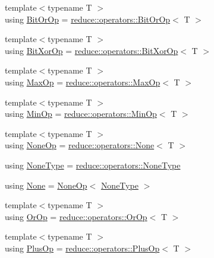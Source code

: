 \begin{DoxyCompactItemize}
\item 
{\footnotesize template$<$typename T $>$ }\\using \hyperlink{namespacevt_1_1collective_a07085d466f47337de6f1d6ea30023c11}{Bit\+Or\+Op} = \hyperlink{structvt_1_1collective_1_1reduce_1_1operators_1_1_bit_or_op}{reduce\+::operators\+::\+Bit\+Or\+Op}$<$ T $>$
\item 
{\footnotesize template$<$typename T $>$ }\\using \hyperlink{namespacevt_1_1collective_a834c8e21559219187ec9ef79f72cf474}{Bit\+Xor\+Op} = \hyperlink{structvt_1_1collective_1_1reduce_1_1operators_1_1_bit_xor_op}{reduce\+::operators\+::\+Bit\+Xor\+Op}$<$ T $>$
\item 
{\footnotesize template$<$typename T $>$ }\\using \hyperlink{namespacevt_1_1collective_aee17b1e7ed3266f7407f01253ecc2807}{Max\+Op} = \hyperlink{structvt_1_1collective_1_1reduce_1_1operators_1_1_max_op}{reduce\+::operators\+::\+Max\+Op}$<$ T $>$
\item 
{\footnotesize template$<$typename T $>$ }\\using \hyperlink{namespacevt_1_1collective_a0d9f013f61a3e2a15a9e0491409f50f2}{Min\+Op} = \hyperlink{structvt_1_1collective_1_1reduce_1_1operators_1_1_min_op}{reduce\+::operators\+::\+Min\+Op}$<$ T $>$
\item 
{\footnotesize template$<$typename T $>$ }\\using \hyperlink{namespacevt_1_1collective_a812e9225d75c8888457b29f971c33f75}{None\+Op} = \hyperlink{structvt_1_1collective_1_1reduce_1_1operators_1_1_none}{reduce\+::operators\+::\+None}$<$ T $>$
\item 
using \hyperlink{namespacevt_1_1collective_af988b64711231f96d33ebfaf891e52a4}{None\+Type} = \hyperlink{namespacevt_1_1collective_1_1reduce_1_1operators_a1e8a587884de5e874a701ee300ca247c}{reduce\+::operators\+::\+None\+Type}
\item 
using \hyperlink{namespacevt_1_1collective_ab9abd77f58f0ede6d24462b95d0a1989}{None} = \hyperlink{namespacevt_1_1collective_a812e9225d75c8888457b29f971c33f75}{None\+Op}$<$ \hyperlink{namespacevt_1_1collective_af988b64711231f96d33ebfaf891e52a4}{None\+Type} $>$
\item 
{\footnotesize template$<$typename T $>$ }\\using \hyperlink{namespacevt_1_1collective_a47e3b11aa019f643f23effceb60ee94a}{Or\+Op} = \hyperlink{structvt_1_1collective_1_1reduce_1_1operators_1_1_or_op}{reduce\+::operators\+::\+Or\+Op}$<$ T $>$
\item 
{\footnotesize template$<$typename T $>$ }\\using \hyperlink{namespacevt_1_1collective_a7a695a8e6ed8247f643918113b7bf881}{Plus\+Op} = \hyperlink{structvt_1_1collective_1_1reduce_1_1operators_1_1_plus_op}{reduce\+::operators\+::\+Plus\+Op}$<$ T $>$
\end{DoxyCompactItemize}
